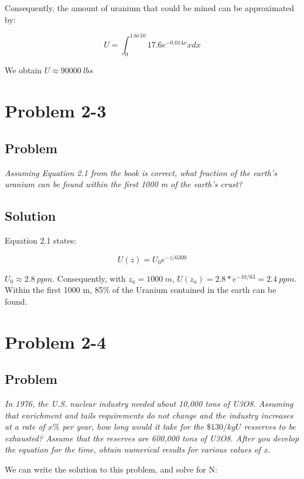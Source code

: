 Consequently, the amount of uranium that could be mined can be approximated by:

\begin{equation}
U = \int_0^{1.6e10} 17.6e^{-0.014x} x dx
\end{equation}

We obtain $U \approx 90000\ lbs$


\section{Problem 2-3}
\label{prob23}


\subsection{Problem}
\textit{Assuming Equation 2.1 from the book is correct, what fraction of the earth's uranium can be found within the first 1000 m of the earth's crust?}

\subsection{Solution}

Equation 2.1 states:

\begin{equation}
U(z) = U_0 e^{-z/6300}
\end{equation}

$U_0 \approx 2.8\ ppm$. Consequently, with $z_a = 1000\ m$, $U(z_a) = 2.8 * e^{-10/63} = 2.4\ ppm$. Within the first 1000 m, 85\% of the Uranium contained in the earth can be found.


\section{Problem 2-4}
\label{prob24}


\subsection{Problem}
\textit{In 1976, the U.S. nuclear industry needed about 10,000 tons of U3O8. Assuming that enrichment and tails requirements do not change and the industry increases at a rate of $x\%$ per year, how long would it take for the $\$130/kgU$ resserves to be exhausted? Assume that the reserves are 600,000 tons of U3O8. After you develop the equation for the time, obtain numerical results for various values of x.}

We can write the solution to this problem, and solve for N:

